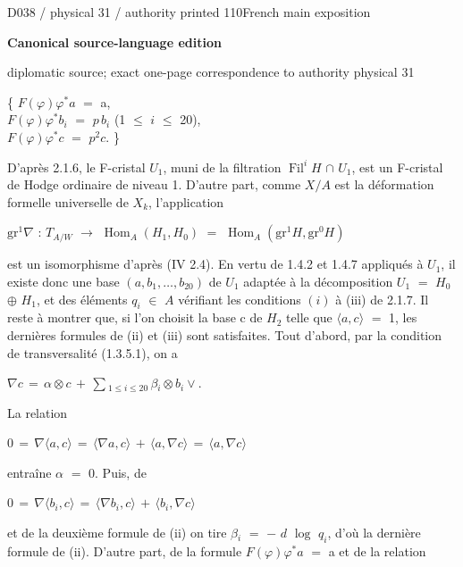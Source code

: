 \documentclass[9pt]{article}
\newcommand{\CanonText}[1]{\par{\fontsize{8.0}{9.35}\selectfont\RaggedRight #1\par}\vspace{2.2pt}}
\newcommand{\CanonDisplay}[1]{\par\vspace{1.2pt}\begin{center}{\fontsize{7.2}{8.4}\selectfont\(\displaystyle #1\)}\end{center}\vspace{1.2pt}}
\newcommand{\LayerTitle}{Canonical source-language edition}
\begin{document}
\noindent\begin{minipage}[t][\dimexpr\textheight-5pt\relax][t]{\textwidth}
{\sffamily\fontsize{7.3}{8.2}\selectfont\color{Quiet} D038 / physical 31 / authority printed 110\hfill French main exposition}
\par{}\vspace{4.5pt}
{\sffamily\fontsize{10.4}{11.6}\selectfont\bfseries\color{Accent} \LayerTitle}
\par{\sffamily\fontsize{6.7}{7.7}\selectfont\color{Quiet} diplomatic source; exact one-page correspondence to authority physical 31}
\vspace{5pt}
\CanonText{\{ \(F(\varphi{})\varphi{}^{*}a\) \(=\) a,\\\(F(\varphi{})\varphi{}^{*}b_{i}\) \(=\) \(p\,b_{i}\) (1 \(\leq{}\) \(i\) \(\leq{}\) 20),\\\(F(\varphi{})\varphi{}^{*}c\) \(=\) \(p^{2}c\). \}}
\CanonText{D'après 2.1.6, le F-cristal \(U_{1}\), muni de la filtration \(\operatorname{Fil}^{i}H\) \(\cap{}\) \(U_{1}\), est un F-cristal de Hodge ordinaire de niveau 1. D'autre part, comme \(X/A\) est la déformation formelle universelle de \(X_{k}\), l'application}
\CanonText{\(\text{gr}^{1}\nabla{}\) : \(T_{A/W}\) \(\to{}\) \(\operatorname{Hom}_{A}(H_{1},H_{0})\) \(=\) \(\operatorname{Hom}_{A}(\text{gr}^{1}H,\text{gr}^{0}H)\)}
\CanonText{est un isomorphisme d'après (IV 2.4). En vertu de 1.4.2 et 1.4.7 appliqués à \(U_{1}\), il existe donc une base \((a,b_{1},\ldots{},b_{20})\) de \(U_{1}\) adaptée à la décomposition \(U_{1}\) \(=\) \(H_{0}\) \(\oplus{}\) \(H_{1}\), et des éléments \(q_{i}\) \(\in{}\) \(A\) vérifiant les conditions \((i)\) à (iii) de 2.1.7. Il reste à montrer que, si l'on choisit la base c de \(H_{2}\) telle que \(\langle{}a,c\rangle{}\) \(=\) 1, les dernières formules de (ii) et (iii) sont satisfaites. Tout d'abord, par la condition de transversalité (1.3.5.1), on a}
\CanonDisplay{\nabla{}c\,=\,\alpha{}\otimes{}c\,+\,\sum{}_{1\leq{}i\leq{}20}\,\beta{}_{i}\otimes{}b_{i}\vee{}.}
\CanonText{La relation}
\CanonDisplay{0\,=\,\nabla{}\langle{}a,c\rangle{}\,=\,\langle{}\nabla{}a,c\rangle{}\,+\,\langle{}a,\nabla{}c\rangle{}\,=\,\langle{}a,\nabla{}c\rangle{}}
\CanonText{entraîne \(\alpha{}\) \(=\) 0. Puis, de}
\CanonDisplay{0\,=\,\nabla{}\langle{}b_{i},c\rangle{}\,=\,\langle{}\nabla{}b_{i},c\rangle{}\,+\,\langle{}b_{i},\nabla{}c\rangle{}}
\CanonText{et de la deuxième formule de (ii) on tire \(\beta{}_{i}\) \(=\) \(-\) \(d\) \(\operatorname{log}\) \(q_{i}\), d'où la dernière formule de (ii). D'autre part, de la formule \(F(\varphi{})\varphi{}^{*}a\) \(=\) a et de la relation}

\end{minipage}
\end{document}

